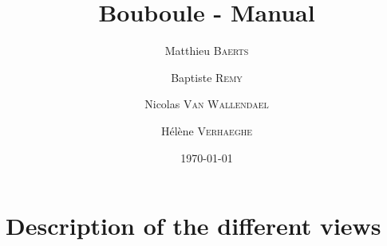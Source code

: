 \documentclass[a4paper,10pt]{report}
\title{Bouboule - Manual}
\author{Matthieu \textsc{Baerts} \and Baptiste \textsc{Remy} \and Nicolas \textsc{Van Wallendael} \and Hélène \textsc{Verhaeghe}}
\date{\today}
\begin{document}
\maketitle

\section*{Description of the different views}

\begin{figure} [h!]
	\centering

\end{figure}
\end{document}
